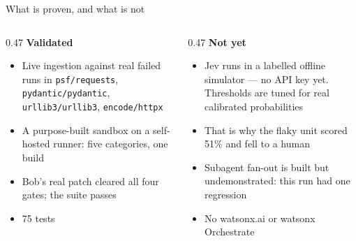\documentclass[aspectratio=169,10pt]{beamer}
\begin{document}
\begin{frame}{What is proven, and what is not}{}
\vspace{0.3cm}
\begin{columns}[T]
\begin{column}{0.47\textwidth}
{\textcolor{good}{\textbf{Validated}}}
\begin{itemize}\setlength\itemsep{0.4em}\small
  \item Live ingestion against real failed runs in \texttt{psf/requests},
        \texttt{pydantic/pydantic}, \texttt{urllib3/urllib3}, \texttt{encode/httpx}
  \item A purpose-built sandbox on a self-hosted runner: five categories, one build
  \item Bob's real patch cleared all four gates; the suite passes
  \item 75 tests
\end{itemize}
\end{column}
\begin{column}{0.47\textwidth}
{\textcolor{flaky}{\textbf{Not yet}}}
\begin{itemize}\setlength\itemsep{0.4em}\small
  \item \textcolor{ink}{Jev runs in a labelled offline simulator} --- no API key yet.
        Thresholds are tuned for real calibrated probabilities
  \item That is why the flaky unit scored 51\% and fell to a human
  \item Subagent fan-out is built but undemonstrated: this run had one regression
  \item No watsonx.ai or watsonx Orchestrate
\end{itemize}
\end{column}
\end{columns}
\end{frame}

\begin{frame}[plain]
\end{frame}
\end{document}
